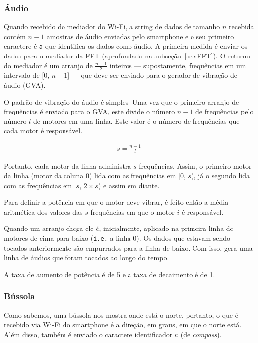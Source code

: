 \documentclass{sig-alternate-05-2015}
\begin{document}
        \subsubsection{Áudio}
            Quando recebido do mediador do Wi-Fi, a string de dados de tamanho
            $n$ recebida contém $n-1$ amostras de áudio enviadas pelo
            smartphone e o seu primeiro caractere é \texttt{a} que identifica
            os dados como áudio. A primeira medida é enviar os dados para o
            mediador da FFT (aprofundado na subseção~\ref{sec:FFT}). O retorno
            do mediador é um arranjo de $\frac{n-1}{2}$ inteiros —
            supostamente, frequências em um intervalo de [$0$, $n-1$] — que
            deve ser enviado para o gerador de vibração de áudio (GVA).
            
            O padrão de vibração do áudio é simples. Uma vez que o primeiro
            arranjo de frequências é enviado para o GVA, este divide o número
            $n-1$ de frequências pelo número $l$ de motores em uma linha. Este
            valor é o número de frequências que cada motor é responsável.
            
            \begin{gather*}
                s = \frac{n-1}{l}
            \end{gather*}
            
            Portanto, cada motor da linha administra $s$ frequências. Assim, o
            primeiro motor da linha (motor da coluna $0$) lida com as
            frequências em [0, $s$), já o segundo lida com as frequências em
            [$s$, $2\times s$) e assim em diante.
            
            Para definir a potência em que o motor deve vibrar, é feito então a
            média aritmética dos valores das $s$ frequências em que o motor $i$
            é responsável.
            
            Quando um arranjo chega ele é, inicialmente, aplicado na primeira
            linha de motores de cima para baixo (\texttt{i.e.} a linha $0$). Os
            dados que estavam sendo tocados anteriormente são empurrados para a
            linha de baixo. Com isso, gera uma linha de áudios que foram
            tocados ao longo do tempo.
            
            A taxa de aumento de potência é de 5 e a taxa de decaimento é de 1.

        \subsubsection{Bússola}
            Como sabemos, uma bússola nos mostra onde está o norte, portanto, o
            que é recebido via Wi-Fi do smartphone é a direção, em graus, em
            que o norte está. Além disso, também é enviado o caractere
            identificador \texttt{c} (de \textit{compass}).
            
\end{document}
